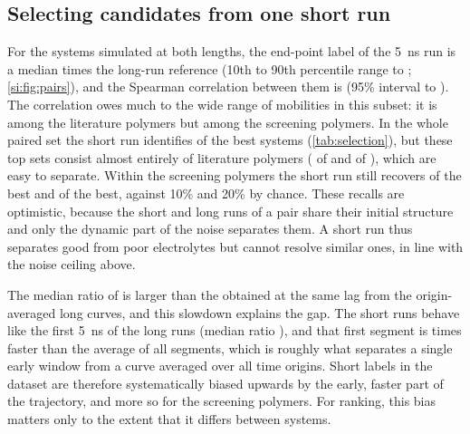 \documentclass[journal=jcisd8,manuscript=article,email=true]{achemso}
\begin{document}
\subsection{Selecting candidates from one short run}\label{sec:res-selection}
For the \nPairs{} systems simulated at both lengths, the end-point label of the
\SI{5}{\nano\second} run is a median \PairEndRatio{} times the long-run reference (10th to 90th percentile range
\PairEndLo{} to \PairEndHi; \cref{si:fig:pairs}), and the Spearman correlation between them is
\PairEndRho{} (95\% interval \PairEndRhoLo{} to \PairEndRhoHi). The correlation owes much to the wide
range of mobilities in this subset: it is \PairEndRhoLit{} among the \nLongLit{} literature
polymers but \PairEndRhoScreen{} among the \nLongScreen{} screening polymers. In the whole
paired set the short run identifies \PairEndTopTenHits{} of the \PairEndTopTenK{} best systems
(\cref{tab:selection}), but these top sets consist almost entirely of literature polymers
(\LitInTopTen{} of \PairEndTopTenK{} and \LitInTopTwenty{} of \PairEndTopTwentyK), which are easy to
separate. Within the \ScrN{} screening polymers the short run still recovers \ScrTopTenHits{} of
the \ScrTopTenK{} best and \ScrTopTwentyHits{} of the \ScrTopTwentyK{} best, against 10\% and 20\%
by chance. These recalls are optimistic, because the short and long runs of a pair share their
initial structure and only the dynamic part of the noise separates them. A short run thus
separates good from poor electrolytes but cannot resolve similar ones, in line with the noise
ceiling above.

The median ratio of \PairEndRatio{} is larger than the \ratioFive{} obtained at the same lag from
the origin-averaged long curves, and this slowdown explains the gap. The short runs behave like the
first \SI{5}{\nano\second} of the long runs (median ratio \techoEndShortPrefRatio), and that
first segment is \segEndFirstVsAll{} times faster than the average of all segments, which is
roughly what separates a single early window from a curve averaged over all time origins. Short
labels in the dataset are therefore systematically biased upwards by the early, faster part of
the trajectory, and more so for the screening polymers. For ranking, this bias matters only to the
extent that it differs between systems.

\begin{table}[ht]
\centering
\caption{Recall of the best systems according to the \SI{50}{\nano\second} reference when they are
selected from the \SI{5}{\nano\second} run of the same system (\nPairs{} systems; the last rows
only the \ScrN{} screening polymers). Intervals by bootstrap over systems; ``Random'' is the expected
recall of a random selection of $k$ systems. All recalls are optimistic, because the two runs of a
pair share their initial structure.}
\label{tab:selection}

\end{table}
\end{document}
